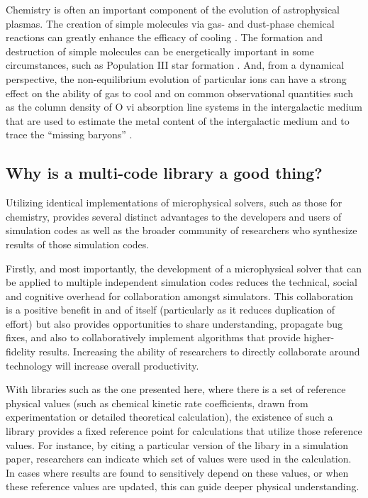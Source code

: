 Chemistry is often an important component of the evolution of
astrophysical plasmas.  The creation of simple molecules via gas- and
dust-phase chemical reactions can greatly enhance the efficacy of
cooling \citep{1979ApJS...41..555H, 2005ApJ...626..627O}.  The formation
and destruction of simple molecules can be energetically important in
some circumstances, such as Population III star formation
\citep{1998ApJ...508..141O, 2002Sci...295...93A, 2008MNRAS.388.1627G,
2009Sci...325..601T}.
And, from a dynamical perspective, the non-equilibrium evolution of
particular ions can have a strong effect on the ability of gas to cool
\citep{1997NewA....2..181A, 1997NewA....2..209A} and on common
observational quantities such as the column density of O {\sc vi} absorption
line systems in the intergalactic medium that are used to estimate the
metal content of the intergalactic medium and to trace the ``missing
baryons'' \citep{2006ApJ...650..573C, 2011ApJ...731....6S,
2013MNRAS.434.1043O, 2014ApJ...796...49S}.

\subsection{Why is a multi-code library a good thing?}

Utilizing identical implementations of microphysical solvers, such as
those for chemistry, provides several distinct advantages to the
developers and users of simulation codes as well as the broader
community of researchers who synthesize results of those simulation
codes.

Firstly, and most importantly, the development of a microphysical solver that
can be applied to multiple independent simulation codes reduces the technical,
social and cognitive overhead for collaboration amongst simulators.
This collaboration is a positive benefit in and of itself (particularly as it
reduces duplication of effort) but also provides opportunities to share
understanding, propagate bug fixes, and also to collaboratively implement 
algorithms that provide higher-fidelity results.  Increasing the ability of
researchers to directly collaborate around technology will increase overall
productivity.

With libraries such as the one presented here, where there is a set of
reference
physical values (such as chemical kinetic rate coefficients, drawn from
experimentation or detailed theoretical calculation), the existence of such a
library provides a fixed reference point for calculations that utilize those
reference values.  For instance, by citing a particular version of
the libary in a simulation paper, researchers can indicate which set of
values were used in the calculation.  In cases where results are found to
sensitively depend on these values, or when these reference values are updated,
this can guide deeper physical understanding.

